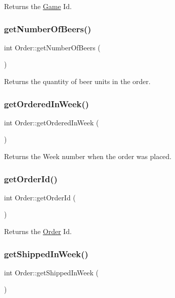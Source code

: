 Returns the \hyperlink{classGame}{Game} Id. \mbox{\label{classOrder_a88e86300e6c1b4a21e4ea042b60a7220}} 
\subsubsection{\texorpdfstring{get\+Number\+Of\+Beers()}{getNumberOfBeers()}}
{\footnotesize\ttfamily int Order\+::get\+Number\+Of\+Beers (\begin{DoxyParamCaption}{ }\end{DoxyParamCaption})}

Returns the quantity of beer units in the order. \mbox{\label{classOrder_aed0ea4435169c95ecc05530df91f225a}} 
\subsubsection{\texorpdfstring{get\+Ordered\+In\+Week()}{getOrderedInWeek()}}
{\footnotesize\ttfamily int Order\+::get\+Ordered\+In\+Week (\begin{DoxyParamCaption}{ }\end{DoxyParamCaption})}

Returns the Week number when the order was placed. \mbox{\label{classOrder_aa5042da754f07b1876aa63615c5f2983}} 
\subsubsection{\texorpdfstring{get\+Order\+Id()}{getOrderId()}}
{\footnotesize\ttfamily int Order\+::get\+Order\+Id (\begin{DoxyParamCaption}{ }\end{DoxyParamCaption})}

Returns the \hyperlink{classOrder}{Order} Id. \mbox{\label{classOrder_a7103f60141cf2fefd053aac011dc7613}} 
\subsubsection{\texorpdfstring{get\+Shipped\+In\+Week()}{getShippedInWeek()}}
{\footnotesize\ttfamily int Order\+::get\+Shipped\+In\+Week (\begin{DoxyParamCaption}{ }\end{DoxyParamCaption})}

